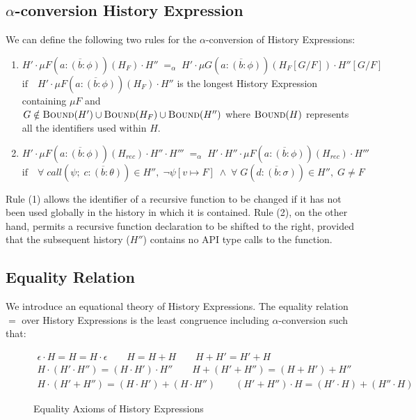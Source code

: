 \subsection{$\alpha$-conversion History Expression}\label{subsec:alpha}

We can define the following two rules for the $\alpha$-conversion of History Expressions:
\begin{enumerate}
    \item $H' \cdot \mu F(\overline{a{:}(b{:}\phi)})(H_F) \cdot H'' \;=_{\alpha}\; H' \cdot \mu G(\overline{a{:}(b{:}\phi)})(H_F[G/F]) \cdot H''[G/F]$ \\
    $\text{if} \quad H' \cdot \mu F(\overline{a{:}(b{:}\phi)})(H_F) \cdot H''$ is the longest History Expression containing $\mu F$ and \\
    $G \notin \textsc{Bound}(H') \cup \textsc{Bound}(H_F) \cup \textsc{Bound}(H'')$ where $\textsc{Bound}(H)$ represents all the identifiers used within $H$.
    \item $H' \cdot \mu F(\overline{a{:}(b{:}\phi)})(H_{rec}) \cdot H'' \cdot H''' \;=_{\alpha}\;  H' \cdot H'' \cdot \mu F(\overline{a{:}(b{:}\phi)})(H_{rec}) \cdot H'''$ \\
    $\text{if} \quad \forall \;call(\psi; \;\overline{c{:}(b{:}\theta)}) \in H'', \; \neg \psi[v \mapsto F] \;\land\; \forall\; G(\overline{d{:}(b{:}{\sigma})}) \in H'', \; G \neq F$
\end{enumerate}

Rule (1) allows the identifier of a recursive function to be changed if it has not been used globally in the history in which it is contained.
Rule (2), on the other hand, permits a recursive function declaration to be shifted to the right, provided that the subsequent history ($H''$) contains no API type calls to the function.

\subsection{Equality Relation}
We introduce an equational theory of History Expressions. The equality relation $=$ over History Expressions is the least congruence including $\alpha$-conversion such that:

\begin{figure}[ht]
    \begin{equation*}
        \begin{gathered}
            \epsilon \cdot H = H = H \cdot \epsilon \quad \quad H = H + H \quad \quad H + H' = H' + H \\
            H \cdot (H' \cdot H'') = (H \cdot H') \cdot H'' \quad \quad H + (H' + H'') = (H + H') + H'' \\
            H \cdot (H' + H'') = (H \cdot H') + (H \cdot H'') \quad \quad (H' + H'') \cdot H = (H' \cdot H) + (H'' \cdot H)
        \end{gathered}
    \end{equation*}
    \caption{Equality Axioms of History Expressions}
    \label{fig:hist_eq}
\end{figure}

